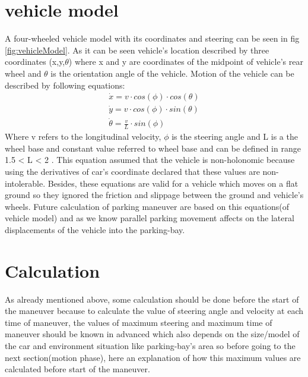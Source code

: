 \section{vehicle model} \label{section: vehicle model}
A four-wheeled vehicle model with its coordinates and steering can be seen in fig \ref{fig:vehicleModel}. As it can be seen vehicle's location described by three coordinates (x,y,$\theta$) where x and y are coordinates of the midpoint of vehicle's rear wheel and $\theta$ is the orientation angle of the vehicle. Motion of the vehicle can be described by following equations:
\begin{align} 
    \dot{x} = v \cdot cos(\phi) \cdot cos(\theta)\nonumber\\
	\dot{y} = v \cdot cos(\phi) \cdot sin(\theta)\nonumber\\
	\dot{\theta} = \frac{v}{L} \cdot sin(\phi)\label{eq2}
\end{align}
Where v refers to the longitudinal velocity, $\phi$ is the steering angle and L is a the wheel base and constant value referred to wheel base and can be defined in range 1.5 < L < 2 \cite{parkingManeuver}. This equation assumed that the vehicle is non-holonomic because using the derivatives of car's coordinate declared that these values are non-intolerable. Besides, these equations are valid for a vehicle which moves on a flat ground so they ignored the friction and slippage between the ground and vehicle's wheels. Future calculation of parking maneuver are based on this equations(of vehicle model) and as we know parallel parking movement affects on the lateral displacements of the vehicle into the parking-bay.
\section{Calculation} \label{section: calculation}
As already mentioned above, some calculation should be done before the start of the maneuver because to calculate the value of steering angle and velocity at each time of maneuver, the values of maximum steering and maximum time of maneuver should be known in advanced which also depends on the size/model of the car and environment situation like parking-bay's area so before going to the next section(motion phase), here an explanation of how this maximum values are calculated before start of the maneuver.
